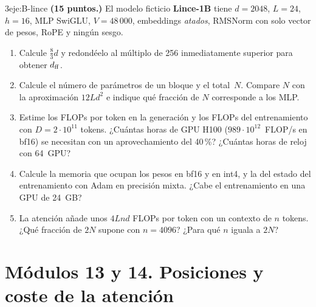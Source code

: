 \begin{ejercicio}{3}{eje:B-lince}
\textbf{(15 puntos.)} El modelo ficticio \textbf{Lince-1B} tiene $d=2048$, $L=24$, $h=16$, MLP SwiGLU, $V=48\,000$, embeddings \emph{atados}, RMSNorm con solo vector de pesos, RoPE y ningún sesgo.
\begin{enumerate}[label=(\alph*)]
  \item {} Calcule $\tfrac{8}{3}d$ y redondéelo al múltiplo de 256 inmediatamente superior para obtener $d_{\mathrm{ff}}$.
  \item {} Calcule el número de parámetros de un bloque y el total~$N$. Compare $N$ con la aproximación $12Ld^{2}$ e indique qué fracción de $N$ corresponde a los MLP.
  \item {} Estime los FLOPs por token en la generación y los FLOPs del entrenamiento con $D=2\cdot 10^{11}$ tokens. ¿Cuántas horas de GPU H100 ($989\cdot 10^{12}$~FLOP/s en bf16) se necesitan con un aprovechamiento del 40\,\%? ¿Cuántas horas de reloj con 64~GPU?
  \item {} Calcule la memoria que ocupan los pesos en bf16 y en int4, y la del estado del entrenamiento con Adam en precisión mixta. ¿Cabe el entrenamiento en una GPU de 24~GB?
  \item {} La atención añade unos $4Lnd$ FLOPs por token con un contexto de $n$ tokens. ¿Qué fracción de $2N$ supone con $n=4096$? ¿Para qué $n$ iguala a $2N$?
\end{enumerate}
\end{ejercicio}

\section*{Módulos 13 y 14. Posiciones y coste de la atención}

